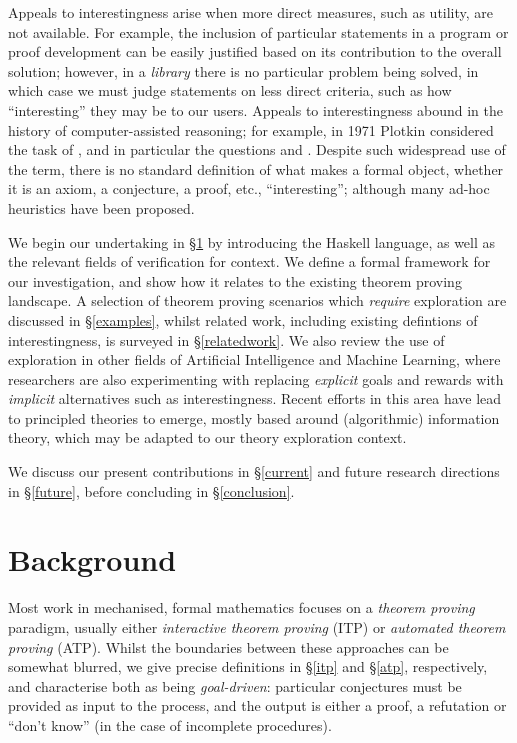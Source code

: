 \documentclass[]{article}
\begin{document}
Appeals to interestingness arise when more direct measures, such as utility, are not available. For example, the inclusion of particular statements in a program or proof development can be easily justified based on its contribution to the overall solution; however, in a \emph{library} there is no particular problem being solved, in which case we must judge statements on less direct criteria, such as how ``interesting'' they may be to our users. Appeals to interestingness abound in the history of computer-assisted reasoning; for example, in 1971 Plotkin \cite{plotkin1971further} considered the task of , and in particular the questions  and . Despite such widespread use of the term, there is no standard definition of what makes a formal object, whether it is an axiom, a conjecture, a proof, etc., ``interesting''; although many ad-hoc heuristics have been proposed.

We begin our undertaking in \S \ref{background} by introducing the Haskell language, as well as the relevant fields of verification for context. We define a formal framework for our investigation, and show how it relates to the existing theorem proving landscape. A selection of theorem proving scenarios which \emph{require} exploration are discussed in \S \ref{examples}, whilst related work, including existing defintions of interestingness, is surveyed in \S \ref{relatedwork}. We also review the use of exploration in other fields of Artificial Intelligence and Machine Learning, where researchers are also experimenting with replacing \emph{explicit} goals and rewards with \emph{implicit} alternatives such as interestingness. Recent efforts in this area have lead to principled theories to emerge, mostly based around (algorithmic) information theory, which may be adapted to our theory exploration context.

We discuss our present contributions in \S \ref{current} and future research directions in \S \ref{future}, before concluding in \S \ref{conclusion}.

\section{Background}
\label{background}

Most work in mechanised, formal mathematics focuses on a \emph{theorem proving} paradigm, usually either \emph{interactive theorem proving} (ITP) or \emph{automated theorem proving} (ATP). Whilst the boundaries between these approaches can be somewhat blurred, we give precise definitions in \S \ref{itp} and \S \ref{atp}, respectively, and characterise both as being \emph{goal-driven}: particular conjectures must be provided as input to the process, and the output is either a proof, a refutation or ``don't know'' (in the case of incomplete procedures).
\end{document}
